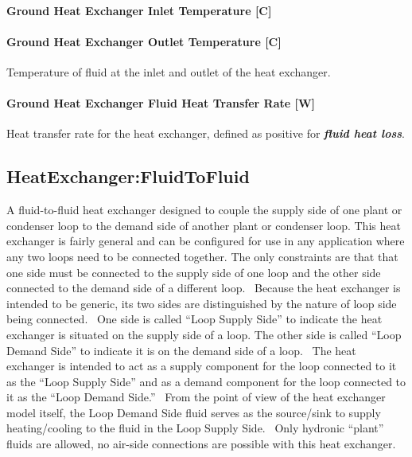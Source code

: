 \paragraph{Ground Heat Exchanger Inlet Temperature {[}C{]}}\label{ground-heat-exchanger-inlet-temperature-c-3}

\paragraph{Ground Heat Exchanger Outlet Temperature {[}C{]}}\label{ground-heat-exchanger-outlet-temperature-c-3}

Temperature of fluid at the inlet and outlet of the heat exchanger.

\paragraph{Ground Heat Exchanger Fluid Heat Transfer Rate {[}W{]}}\label{ground-heat-exchanger-fluid-heat-transfer-rate-w}

Heat transfer rate for the heat exchanger, defined as positive for \textbf{\emph{fluid heat loss}}.

\subsection{HeatExchanger:FluidToFluid}\label{heatexchangerfluidtofluid}

A fluid-to-fluid heat exchanger designed to couple the supply side of one plant or condenser loop to the demand side of another plant or condenser loop. This heat exchanger is fairly general and can be configured for use in any application where any two loops need to be connected together. The only constraints are that that one side must be connected to the supply side of one loop and the other side connected to the demand side of a different loop.~ Because the heat exchanger is intended to be generic, its two sides are distinguished by the nature of loop side being connected.~ One side is called ``Loop Supply Side'' to indicate the heat exchanger is situated on the supply side of a loop. The other side is called ``Loop Demand Side'' to indicate it is on the demand side of a loop.~ The heat exchanger is intended to act as a supply component for the loop connected to it as the ``Loop Supply Side'' and as a demand component for the loop connected to it as the ``Loop Demand Side.''~ From the point of view of the heat exchanger model itself, the Loop Demand Side fluid serves as the source/sink to supply heating/cooling to the fluid in the Loop Supply Side.~ Only hydronic ``plant'' fluids are allowed, no air-side connections are possible with this heat exchanger.

